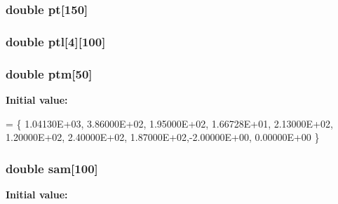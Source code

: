 \hypertarget{nrlmsise-00__data_8c_aa3caa9a62f4d69b33356c093e59da51f}{
\subsubsection[{pt}]{\setlength{\rightskip}{0pt plus 5cm}double pt\mbox{[}150\mbox{]}}}\label{nrlmsise-00__data_8c_aa3caa9a62f4d69b33356c093e59da51f}
\hypertarget{nrlmsise-00__data_8c_a34941bdba8aa11fb952a012ae87fd02c}{
\subsubsection[{ptl}]{\setlength{\rightskip}{0pt plus 5cm}double ptl\mbox{[}4\mbox{]}\mbox{[}100\mbox{]}}}\label{nrlmsise-00__data_8c_a34941bdba8aa11fb952a012ae87fd02c}
\hypertarget{nrlmsise-00__data_8c_a7d39dedd36f08d4f3ee17c979bf92332}{
\subsubsection[{ptm}]{\setlength{\rightskip}{0pt plus 5cm}double ptm\mbox{[}50\mbox{]}}}\label{nrlmsise-00__data_8c_a7d39dedd36f08d4f3ee17c979bf92332}
{\bfseries Initial value\+:}
\begin{DoxyCode}
= \{
     1.04130E+03, 3.86000E+02, 1.95000E+02, 1.66728E+01, 2.13000E+02,
     1.20000E+02, 2.40000E+02, 1.87000E+02,-2.00000E+00, 0.00000E+00
\}
\end{DoxyCode}
\hypertarget{nrlmsise-00__data_8c_ae391523526f8ec527742657b4f50db0e}{
\subsubsection[{sam}]{\setlength{\rightskip}{0pt plus 5cm}double sam\mbox{[}100\mbox{]}}}\label{nrlmsise-00__data_8c_ae391523526f8ec527742657b4f50db0e}
{\bfseries Initial value\+:}
